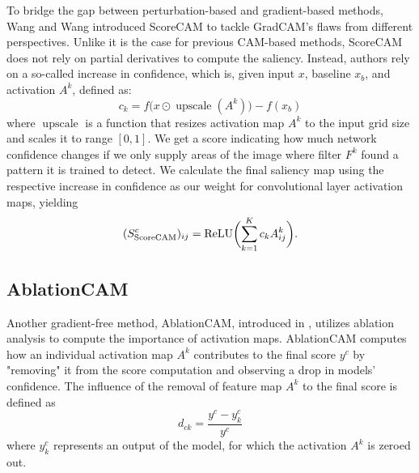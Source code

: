 To bridge the gap between perturbation-based and gradient-based methods, Wang and Wang \cite{score-cam} introduced ScoreCAM to tackle GradCAM's flaws from different perspectives.
Unlike it is the case for previous CAM-based methods, ScoreCAM does not rely on partial derivatives to compute the saliency.
Instead, authors rely on a so-called increase in confidence, which is, given input $x$, baseline $x_b$, and activation $A^k$, defined as:
\begin{equation}
    c_k = f\bigl(x \odot \operatorname{upscale}(A^k)\bigr) - f(x_b)
\end{equation}
where $\operatorname{upscale}$ is a function that resizes activation map $A^k$ to the input grid size and scales it to range $[0, 1]$.
We get a score indicating how much network confidence changes if we only supply areas of the image where filter $F^k$ found a pattern it is trained to detect.
We calculate the final saliency map using the respective increase in confidence as our weight for convolutional layer activation maps, yielding
\begin{equation}
    (S^c_{\text{ScoreCAM}})_{ij} = \operatorname{ReLU}\biggl(\sum_{k=1}^K c_k A^k_{ij}\biggr).
\end{equation}


\subsection{AblationCAM}

Another gradient-free method, AblationCAM, introduced in \cite{ablation-cam}, utilizes ablation analysis to compute the importance of activation maps.
AblationCAM computes how an individual activation map $A^k$ contributes to the final score $y^c$ by "removing" it from the score computation and observing a drop in models' confidence.
The influence of the removal of feature map $A^k$ to the final score is defined as
\begin{equation}\label{eq:ablation-cam-importance-weight}
    d_{ck} = \frac{y^c - y^c_k}{y^c}
\end{equation}
where $y^c_k$ represents an output of the model, for which the activation $A^k$ is zeroed out.

